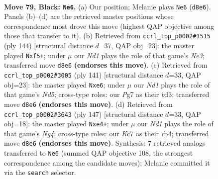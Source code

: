 \documentclass[11pt]{article}
\begin{document}
\clearpage

\begin{figure}[p]\centering
\begin{subfigure}{0.46\textwidth}\centering
\resizebox{\linewidth}{!}{%
\newchessgame
\chessboard[
  setfen={3n4/2k3p1/2P3p1/pp6/1p6/8/K7/2q5 b - - 0 79},
  showmover=false,
  pgfstyle=straightmove, color=movearrow, markmove={d8-e6}
]}
\caption{}
\end{subfigure}\hfill
\begin{subfigure}{0.46\textwidth}\centering
\resizebox{\linewidth}{!}{%
\newchessgame
\chessboard[
  setfen={8/8/2p5/5p2/1KPPp2P/p3N1k1/8/8 w - - 0 73},
  showmover=false,
  pgfstyle=straightmove, color=movearrow, markmove={e3-f5}
]}
\caption{}
\end{subfigure}
\\[4pt]
\begin{subfigure}{0.46\textwidth}\centering
\resizebox{\linewidth}{!}{%
\newchessgame
\chessboard[
  setfen={8/4p3/4P3/7p/3n2k1/3B2P1/6K1/8 b - - 8 71},
  showmover=false,
  pgfstyle=straightmove, color=movearrow, markmove={d4-e6}
]}
\caption{}
\end{subfigure}\hfill
\begin{subfigure}{0.46\textwidth}\centering
\resizebox{\linewidth}{!}{%
\newchessgame
\chessboard[
  setfen={3k4/8/3p2p1/3P2n1/1Rp1P3/8/3K4/8 b - - 0 74},
  showmover=false,
  pgfstyle=straightmove, color=movearrow, markmove={g5-e4}
]}
\caption{}
\end{subfigure}
\caption{\textbf{Move 79, Black: \texttt{Ne6}.} (a) Our position; Melanie plays \texttt{Ne6} (\texttt{d8e6}). Panels (b)--(d) are the retrieved master positions whose correspondence most drove this move (highest QAP objective among those that transfer to it). (b) Retrieved from \texttt{ccrl\_top\_p0002\#1515} (ply 144) [structural distance $d$=37, QAP obj=23]: the master played \texttt{Nxf5+}; under $\mu$ our \emph{Nd1} plays the role of that game's \emph{Ne3}; transferred move \texttt{d8e6} \textbf{(endorses this move)}. (c) Retrieved from \texttt{ccrl\_top\_p0002\#3005} (ply 141) [structural distance $d$=33, QAP obj=23]: the master played \texttt{Nxe6}; under $\mu$ our \emph{Nd1} plays the role of that game's \emph{Nd5}; cross-type roles: our \emph{P}g7 as their \emph{b}d3; transferred move \texttt{d8e6} \textbf{(endorses this move)}. (d) Retrieved from \texttt{ccrl\_top\_p0002\#3643} (ply 147) [structural distance $d$=33, QAP obj=18]: the master played \texttt{Nxe4+}; under $\mu$ our \emph{Nd1} plays the role of that game's \emph{Ng4}; cross-type roles: our \emph{K}c7 as their \emph{r}b4; transferred move \texttt{d8e6} \textbf{(endorses this move)}. Synthesis: 7 retrieved analogs transferred to \texttt{Ne6} (summed QAP objective 108, the strongest correspondence among the candidate moves); Melanie committed it via the \texttt{search} selector.}
\label{fig:thought-m157}
\end{figure}
\end{document}
